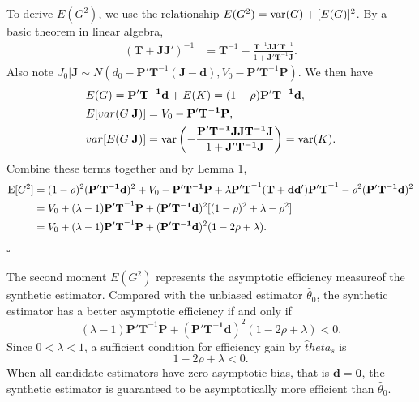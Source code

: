 \documentclass{article}
\begin{document}
To derive $E(G^2)$, we use the relationship $E(G^2) = \mbox{var}(G) + [E(G)]^2$.  By a basic theorem in linear algebra,
 \begin{displaymath}\begin{split}
  (\mathbf T + \mathbf{JJ'})^{-1}    & = \mathbf T^{-1} -\frac{\mathbf T^{-1}\mathbf{JJ'}\mathbf T^{-1}}{1+\mathbf{J'}\mathbf T^{-1}\mathbf{J}}.
\end{split}\end{displaymath}
Also note
$ 	J_0 | \mathbf J \sim N(d_0 -\mathbf P'\mathbf{T}^{-1}(\mathbf J - \mathbf d), 
 	                                                       V_0 - \mathbf P' \mathbf{T}^{-1} \mathbf P ).$ We then have
 \begin{displaymath}\begin{split}
&E(G ) = \mathbf{P'T^{-1}d} + E (K) = (1-\rho)\mathbf{P'T^{-1}d}, \\
 & E [ var( G | \mathbf J) ] = V_0  - \mathbf{P'T^{-1}P},\\
 & var [ E ( G |  \mathbf J) ]
   = \mbox{var} \left ( -\frac{\mathbf P' \mathbf{T^{-1}JJ T^{-1}J}}{1+\mathbf{J'T^{-1}J}}  \right )
    = \mbox{var} (K).
  \end{split}
 \end{displaymath}
Combine these terms together and by Lemma 1,
 \begin{displaymath}\begin{split}
\mbox{E}[ G^2 ] &   
  =   (1-\rho)^2(\mathbf{P'T^{-1}d} )^2
      +   V_0  - \mathbf{P'T^{-1}P}  
      +\lambda \mathbf{P'T}^{-1} (\mathbf T + \mathbf{dd'}) \mathbf{P'T}^{-1}  - \rho^2 (\mathbf{P'T^{-1}d})^2\\
      &=V_0  + (\lambda-1)\mathbf{P'T}^{-1} \mathbf P
          +(\mathbf{P'T^{-1}d} )^2 [ (1-\rho)^2  + \lambda -\rho^2]\\
       &=V_0  +    (\lambda-1)\mathbf{P'T}^{-1} \mathbf P +
            (\mathbf{P'T^{-1}d} )^2 ( 1 -2\rho +\lambda).
 \end{split}\end{displaymath}
  $\square$

The second moment $E(G^2)$ represents the asymptotic efficiency measureof the synthetic estimator. Compared with the unbiased estimator $\hat \theta_0$, the synthetic estimator has a better asymptotic efficiency if and only if 
\begin{equation}
(\lambda-1)\mathbf{P'T}^{-1} \mathbf P +
            (\mathbf{P'T^{-1}d} )^2 ( 1 -2\rho +\lambda) < 0.
\end{equation}
Since $0<\lambda<1$, a sufficient condition for efficiency gain by $\hat theta_s$ is
\begin{equation}
    1 -2\rho +\lambda < 0.  
\end{equation}
When all candidate estimators have zero asymptotic bias, that is $\mathbf d = \mathbf 0$, the synthetic estimator is guaranteed to be asymptotically more efficient than $\hat \theta_0$.   
\end{document}
